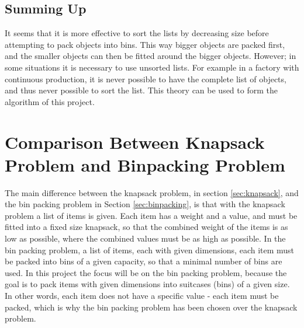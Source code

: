 \subsection{Summing Up}
It seems that it is more effective to sort the lists by decreasing size before attempting to pack objects into bins. This way bigger objects are packed first, and the smaller objects can then be fitted around the bigger objects. However; in some situations it is necessary to use unsorted lists. For example in a factory with continuous production, it is never possible to have the complete list of objects, and thus never possible to sort the list. This theory can be used to form the algorithm of this project.
\section{Comparison Between Knapsack Problem and Binpacking Problem}
The main difference between the knapsack problem, in section \ref{sec:knapsack}, and the bin packing problem in Section \ref{sec:binpacking}, is that with the knapsack problem a list of items is given. Each item has a weight and a value, and must be fitted into a fixed size knapsack, so that the combined weight of the items is as low as possible, where the combined values must be as high as possible. In the bin packing problem, a list of items, each with given dimensions, each item must be packed into bins of a given capacity, so that a minimal number of bins are used. In this project the focus will be on the bin packing problem, because the goal is to pack items with given dimensions into suitcases (bins) of a given size. In other words, each item does not have a specific value - each item must be packed, which is why the bin packing problem has been chosen over the knapsack problem.